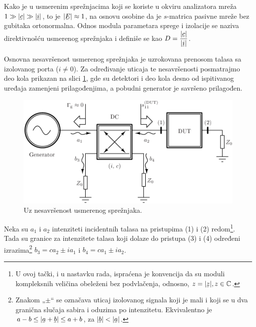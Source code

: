\documentclass[a4paper, 12pt, diplomski]{etf}
\renewcommand{\unit}[1]{\,{\rm #1}}   %
\newcommand{\faz}[1]{\underaccent{\bar}{#1}}
\begin{document}
%
Kako je u 
usmerenim sprežnjacima koji se koriste u okviru analizatora mreža
$1 \gg |\faz c| \gg |\faz i|$, to je 
$|\faz E| \approx 1$, na osnovu osobine da je $s$-matrica pasivne mreže bez gubitaka ortonormalna. 
Odnos modula parametara 
sprege i izolacije se naziva direktivnošću usmerenog
sprežnjaka i definiše se kao $D = \dfrac{|\faz c|}{|\faz i|}$.



Osnovna nesavršenost usmerenog sprežnjaka
je uzrokovana prenosom talasa 
sa izolovanog porta ($i\neq 0$).
Za određivanje uticaja te nesavršenosti 
posmatrajmo deo kola prikazan na slici
\ref{fig:dc_imp}, gde su detektori 
i deo kola desno od ispitivanog uređaja
zamenjeni prilagođenjima, a pobudni 
generator je savršeno prilagođen.
%
\begin{figure}[t!]
    \centering
    \includegraphics{fig/dc_imperf.pdf}
    \caption{Uz nesavršenost usmerenog
    sprežnjaka.}
    \label{fig:dc_imp}
\end{figure}
%
Neka su 
$a_1$ i $a_2$
intenziteti incidentnih talasa na pristupima (1) i (2) 
redom\footnote{
U ovoj tački, i u nastavku rada, ispraćena je konvencija
da su moduli kompleksnih veličina obeleženi 
bez podvlačenja, odnosno, 
$z = |\faz z|, z \in \mathbb C$.
}.
Tada su granice za 
intenzitete talasa koji dolaze do pristupa (3) i 
(4) određeni izrazima\footnote{
Znakom „$\pm$“ se označava uticaj
izolovanog signala koji je mali i koji se u dva granična slučaja
sabira i oduzima po intenzitetu. Ekvivalentno je 
$a - b \leq |\faz a + \faz b| \leq a + b$, za $|\faz b| < |\faz a|$.
}
$b_3 = ca_2 \pm ia_1$ i $b_4 = ca_1 \pm ia_2$.
\end{document}
